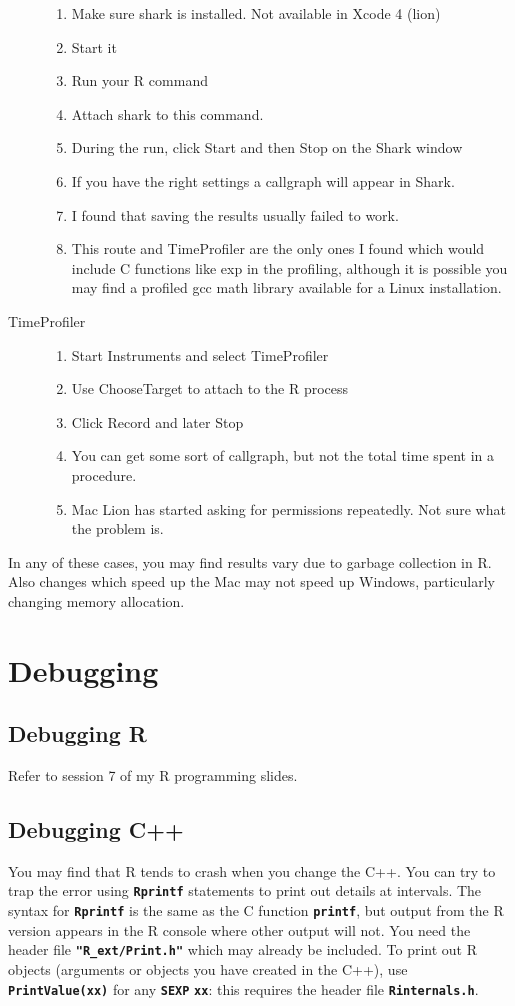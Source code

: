 \documentclass[12pt, a4paper]{article}
\renewcommand{\=}{\,=\,}
\newcommand{\+}{\,+\,}
\newcommand{\sfn}[1]{\textbf{\texttt{#1}}}
\begin{document}
\begin{description}
\begin{enumerate}
\item Make sure shark is installed. Not available in Xcode 4 (lion)
\item Start it
\item Run your R command
\item Attach shark to this command.
\item During the run, click Start and then Stop  on the Shark window
\item If you have the right settings a callgraph will appear in Shark.
\item I found that saving the results usually failed to work.
\item This route and TimeProfiler are the only ones I found which would include
  C functions like exp in the profiling, although it is possible you may find a
  profiled gcc math library available for a Linux installation.
\end{enumerate}
\item[TimeProfiler]
\begin{enumerate}
\item Start Instruments and select TimeProfiler
\item Use ChooseTarget to attach to the R process
\item Click Record and later Stop
\item You can get some sort of callgraph, but not the total time spent in a
  procedure.
\item Mac Lion has started asking for permissions repeatedly. Not sure what the
  problem is.
\end{enumerate}
\end{description}

In any of these cases, you may find results vary due to garbage
collection in R. Also changes which speed up the Mac may not speed up Windows,
particularly changing memory allocation.
\section{Debugging}

\subsection{Debugging R}
Refer to session 7 of my R programming slides.
\subsection{Debugging C++}
You may find that R tends to crash when you change the C++. You can try to trap
the error using \sfn{Rprintf} statements to print out details at intervals. The
syntax for \sfn{Rprintf} is the same as the C function \sfn{printf}, but output
from the R version appears in the R console where other output will not. You
need the header file \sfn{"R\_ext/Print.h"} which may already be included. To
print out R objects (arguments or objects you have created in the C++), use
\sfn{PrintValue(xx)} for any \sfn{SEXP} \sfn{xx}: this requires the header file
\sfn{Rinternals.h}.
\end{document}
